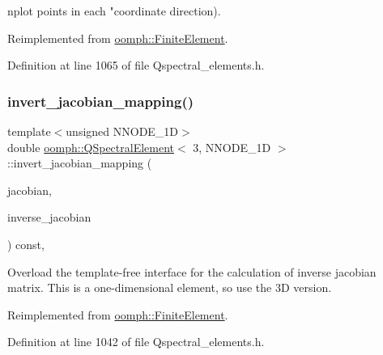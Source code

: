 nplot points in each "coordinate direction). 

Reimplemented from \hyperlink{classoomph_1_1FiniteElement_a82da844fd3ebb2005842464cdc148a03}{oomph\+::\+Finite\+Element}.



Definition at line 1065 of file Qspectral\+\_\+elements.\+h.

\mbox{\label{classoomph_1_1QSpectralElement_3_013_00_01NNODE__1D_01_4_acd46ab878ddbff7735a36325388626fb}} 
\subsubsection{\texorpdfstring{invert\+\_\+jacobian\+\_\+mapping()}{invert\_jacobian\_mapping()}}
{\footnotesize\ttfamily template$<$unsigned N\+N\+O\+D\+E\+\_\+1D$>$ \\
double \hyperlink{classoomph_1_1QSpectralElement}{oomph\+::\+Q\+Spectral\+Element}$<$ 3, N\+N\+O\+D\+E\+\_\+1D $>$\+::invert\+\_\+jacobian\+\_\+mapping (\begin{DoxyParamCaption}\item[{const \hyperlink{classoomph_1_1DenseMatrix}{Dense\+Matrix}$<$ double $>$ \&}]{jacobian,  }\item[{\hyperlink{classoomph_1_1DenseMatrix}{Dense\+Matrix}$<$ double $>$ \&}]{inverse\+\_\+jacobian }\end{DoxyParamCaption}) const\hspace{0.3cm}{\ttfamily [inline]}, {\ttfamily [virtual]}}



Overload the template-\/free interface for the calculation of inverse jacobian matrix. This is a one-\/dimensional element, so use the 3D version. 



Reimplemented from \hyperlink{classoomph_1_1FiniteElement_a42c86a7628fee00d3a9d35b935b29e48}{oomph\+::\+Finite\+Element}.



Definition at line 1042 of file Qspectral\+\_\+elements.\+h.

